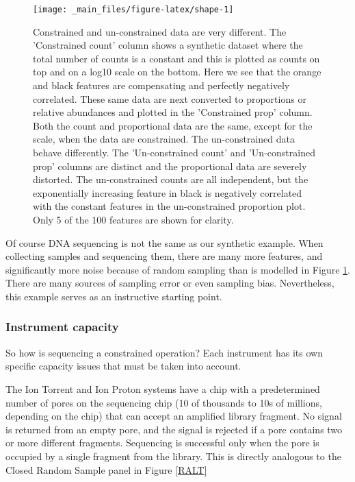 \documentclass[onecolumn]{article}
\begin{document}
\begin{figure}

{\centering \texttt{[image: \_main\_files/figure-latex/shape-1]} 

}

\caption{Constrained and un-constrained data are very different. The 'Constrained count' column shows a synthetic dataset where the total number of counts is a constant and this is plotted as counts on top and on a log10 scale on the bottom. Here we see that the orange and black features are compensating and perfectly negatively correlated. These same data are next converted to proportions or relative abundances and plotted in the 'Constrained prop' column. Both the count and proportional data are the same, except for the scale, when the data are constrained. The un-constrained data behave differently. The 'Un-constrained count' and 'Un-constrained prop' columns are distinct and the proportional data are severely distorted. The un-constrained counts are all independent, but the  exponentially increasing feature in black is negatively correlated with the constant features in the un-constrained proportion plot. Only 5 of the 100 features are shown for clarity.}\label{fig:shape}
\end{figure}

Of course DNA sequencing is not the same as our synthetic example. When collecting samples and sequencing them, there are many more features, and significantly more noise because of random sampling than is modelled in Figure \ref{fig:shape}. There are many sources of sampling error or even sampling bias. Nevertheless, this example serves as an instructive starting point.

\hypertarget{instrument-capacity}{%
\subsubsection{Instrument capacity}\label{instrument-capacity}}

So how is sequencing a constrained operation? Each instrument has its own specific capacity issues that must be taken into account.

The Ion Torrent and Ion Proton systems have a chip with a predetermined number of pores on the sequencing chip (10 of thousands to 10s of millions, depending on the chip) that can accept an amplified library fragment. No signal is returned from an empty pore, and the signal is rejected if a pore contains two or more different fragments. Sequencing is successful only when the pore is occupied by a single fragment from the library. This is directly analogous to the Closed Random Sample panel in Figure \ref{RALT}
\end{document}
